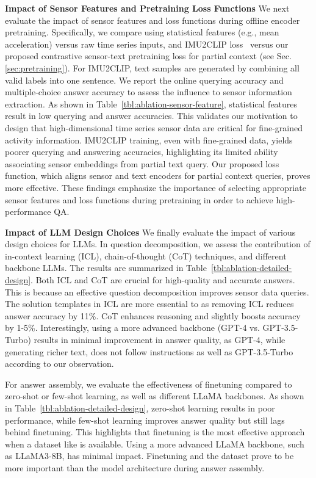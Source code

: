 \textbf{Impact of Sensor Features and Pretraining Loss Functions}
We next evaluate the impact of sensor features and loss functions during offline encoder pretraining.
Specifically, we compare using statistical features (e.g., mean acceleration) versus raw time series inputs, and IMU2CLIP loss~\cite{moon-etal-2023-imu2clip} versus our proposed contrastive sensor-text pretraining loss for partial context (see Sec.\ref{sec:pretraining}). 
For IMU2CLIP, text samples are generated by combining all valid labels into one sentence. We report the online querying accuracy and multiple-choice answer accuracy to assess the influence to sensor information extraction.
As shown in Table~\ref{tbl:ablation-sensor-feature}, statistical features result in low querying and answer accuracies. This validates our motivation to design \Method that high-dimensional time series sensor data are critical for fine-grained activity information. IMU2CLIP training, even with fine-grained data, yields poorer querying and answering accuracies, highlighting its limited ability associating sensor embeddings from partial text query. Our proposed loss function, which aligns sensor and text encoders for partial context queries, proves more effective. These findings emphasize the importance of selecting appropriate sensor features and loss functions during pretraining in order to achieve high-performance QA.


\textbf{Impact of LLM Design Choices}
We finally evaluate the impact of various design choices for LLMs. 
In question decomposition, we assess the contribution of in-context learning (ICL), chain-of-thought (CoT) techniques, and different backbone LLMs.
The results are summarized in Table~\ref{tbl:ablation-detailed-design}. 
Both ICL and CoT are crucial for high-quality and accurate answers. This is because an effective question decomposition improves sensor data queries. The solution templates in ICL are more essential to \Method as removing ICL reduces answer accuracy by 11\%. CoT enhances reasoning and slightly boosts accuracy by 1-5\%. Interestingly, using a more advanced backbone (GPT-4 vs. GPT-3.5-Turbo) results in minimal improvement in answer quality, as GPT-4, while generating richer text, does not follow instructions as well as GPT-3.5-Turbo according to our observation.

For answer assembly, we evaluate the effectiveness of finetuning compared to zero-shot or few-shot learning, as well as different LLaMA backbones. As shown in Table~\ref{tbl:ablation-detailed-design}, zero-shot learning results in poor performance, while few-shot learning improves answer quality but still lags behind finetuning. This highlights that finetuning is the most effective approach when a dataset like \Dataset is available. Using a more advanced LLaMA backbone, such as LLaMA3-8B, has minimal impact. Finetuning and the dataset prove to be more important than the model architecture during answer assembly.

